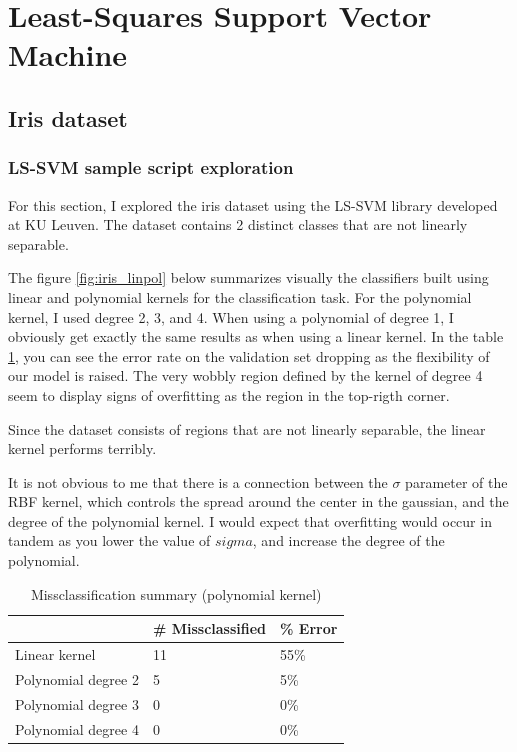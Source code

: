 \documentclass[11pt, a4paper]{article}
\begin{document}
\section{Least-Squares Support Vector Machine}

\subsection{Iris dataset}

\subsubsection{LS-SVM sample script exploration}
For this section, I explored the iris dataset using the LS-SVM library
developed at KU Leuven. The dataset contains 2 distinct classes that
are not linearly separable.

The figure \ref{fig:iris_linpol} below summarizes visually the
classifiers built using linear and polynomial kernels for the
classification task. For the polynomial kernel, I used degree 2, 3,
and 4. When using a polynomial of degree 1, I obviously get exactly
the same results as when using a linear kernel. In the table
\ref{table:iris_linpol}, you can see the error rate on the validation
set dropping as the flexibility of our model is raised. The very
wobbly region defined by the kernel of degree 4 seem to display signs
of overfitting as the region in the top-rigth corner.

Since the dataset consists of regions that are not linearly separable,
the linear kernel performs terribly.

It is not obvious to me that there is a connection between the
$\sigma$ parameter of the RBF kernel, which controls the spread around
the center in the gaussian, and the degree of the polynomial kernel. I
would expect that overfitting would occur in tandem as you lower the
value of $sigma$, and increase the degree of the polynomial.

\begin{table}[H]
  \centering
  \begin{tabular}{l|l|l|}
    \cline{2-3}
    & \# Missclassified & \% Error \\ \hline
    \multicolumn{1}{|l|}{Linear kernel}       & 11                & 55\%     \\ \hline
    \multicolumn{1}{|l|}{Polynomial degree 2} & 5                 & 5\%      \\ \hline
    \multicolumn{1}{|l|}{Polynomial degree 3} & 0                 & 0\%      \\ \hline
    \multicolumn{1}{|l|}{Polynomial degree 4} & 0                 & 0\%      \\ \hline
  \end{tabular}
  \caption{Missclassification summary (polynomial kernel)}
  \label{table:iris_linpol}
\end{table}
\end{document}
